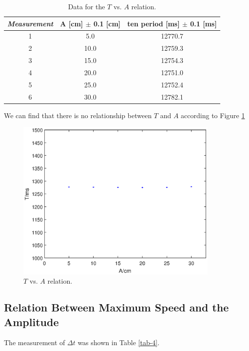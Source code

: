 \documentclass{article}
\begin{document}
\begin{table}[!h]
\begin{center}
\begin{tabular}{|c|c|c|}
\hline
\textit{Measurement} & A [cm] $\pm$ 0.1 [cm] & ten period [ms] $\pm$ 0.1 [ms]\\
\hline
1	&	5.0		&	12770.7\\
2	&	10.0	&	12759.3\\
3	&	15.0	&	12754.3\\
4	&	20.0	&	12751.0\\
5	&	25.0	&	12752.4\\
6	&	30.0	&	12782.1\\
\hline
\end{tabular}
\caption{Data for the $T$ vs. $A$ relation.}
\label{tab-3}
\end{center}
\end{table}

We can find that there is no relationship between $T$ and $A$ according to Figure \ref{fig-6}

\begin{figure}[!h]
	\centering
	\includegraphics[width=10cm]{fig-6.eps}
	\caption{$T$ vs. $A$ relation.
	\label{fig-6}}
\end{figure}

\subsection{Relation Between Maximum Speed and the Amplitude}

The measurement of $\Delta t$ was shown in Table \ref{tab-4}.\\
\end{document}
